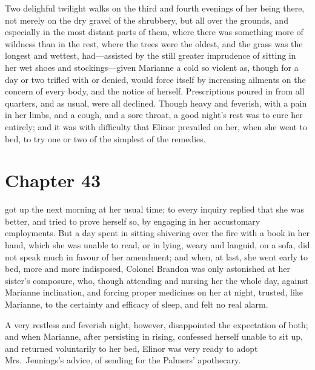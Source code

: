 Two delighful twilight walks on the third and fourth
evenings of her being there, not merely on the dry gravel
of the shrubbery, but all over the grounds, and especially
in the most distant parts of them, where there was something
more of wildness than in the rest, where the trees were
the oldest, and the grass was the longest and wettest,
had---assisted by the still greater imprudence of sitting
in her wet shoes and stockings---given Marianne a cold
so violent as, though for a day or two trifled with
or denied, would force itself by increasing ailments on
the concern of every body, and the notice of herself.
Prescriptions poured in from all quarters, and as usual,
were all declined.  Though heavy and feverish, with a pain
in her limbs, and a cough, and a sore throat, a good night's
rest was to cure her entirely; and it was with difficulty
that Elinor prevailed on her, when she went to bed,
to try one or two of the simplest of the remedies.



\chapter{Chapter 43}


 got up the next morning at her usual time;
to every inquiry replied that she was better, and tried to
prove herself so, by engaging in her accustomary employments.
But a day spent in sitting shivering over the fire
with a book in her hand, which she was unable to read,
or in lying, weary and languid, on a sofa, did not speak
much in favour of her amendment; and when, at last,
she went early to bed, more and more indisposed, Colonel
Brandon was only astonished at her sister's composure,
who, though attending and nursing her the whole day,
against Marianne inclination, and forcing proper medicines
on her at night, trusted, like Marianne, to the certainty
and efficacy of sleep, and felt no real alarm.

A very restless and feverish night, however,
disappointed the expectation of both; and when Marianne,
after persisting in rising, confessed herself unable
to sit up, and returned voluntarily to her bed,
Elinor was very ready to adopt Mrs.\ Jennings's advice,
of sending for the Palmers' apothecary.

